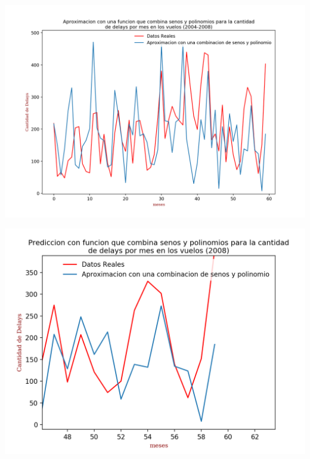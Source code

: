 \documentclass{endm}
\begin{document}
	\begin{center}
	\includegraphics[scale=0.5]{imagenes/polinomioysenos.png}
	\end{center}

	\begin{center}
	\includegraphics[scale=0.8]{imagenes/delays2008.png}
	\end{center}
\end{document}
